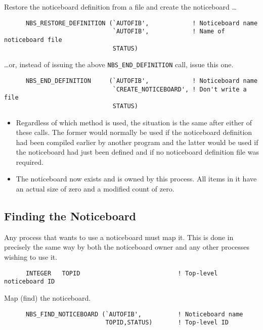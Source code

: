 Restore the noticeboard definition from a file and create the noticeboard
\ldots

\begin {verbatim}
      NBS_RESTORE_DEFINITION (`AUTOFIB',            ! Noticeboard name
                              `AUTOFIB',            ! Name of noticeboard file
                              STATUS)
\end{verbatim}

\ldots or, instead of issuing the above {\tt NBS\_END\_DEFINITION} call, issue
this one.

\begin {verbatim}
      NBS_END_DEFINITION     (`AUTOFIB',            ! Noticeboard name
                              `CREATE_NOTICEBOARD', ! Don't write a file
                              STATUS)
\end{verbatim}

\begin {itemize}
\item Regardless of which method is used, the situation is the same after either
of these calls. The former would normally be used if the noticeboard definition
had been compiled earlier by another program and the latter would be used if
the noticeboard had just been defined and if no noticeboard definition file was
required.
\item The noticeboard now exists and is owned by this process. All items in it
have an actual size of zero and a modified count of zero.
\end {itemize}

\subsection {Finding the Noticeboard}

Any process that wants to use a noticeboard must map it. This is done in
precisely the same way by both the noticeboard owner and any other processes
wishing to use it.

\begin {verbatim}
      INTEGER   TOPID                           ! Top-level noticeboard ID
\end{verbatim}

Map (find) the noticeboard.

\begin {verbatim}
      NBS_FIND_NOTICEBOARD (`AUTOFIB',          ! Noticeboard name
                            TOPID,STATUS)       ! Top-level ID
\end{verbatim}

